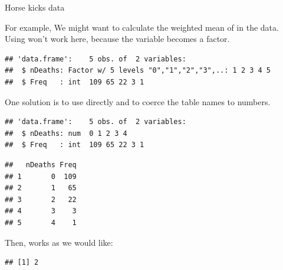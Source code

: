 \documentclass[11pt]{book}
\renewenvironment{knitrout}{\small\renewcommand{\baselinestretch}{.85}}{} %
\begin{document}
\begin{Example}[horse.df]{Horse kicks data}

For example, We might want to calculate the weighted mean of 
in the  data. 
Using  won't work here, because the variable 
becomes a factor.

\begin{knitrout}
\color{fgcolor}\begin{kframe}
\begin{alltt}
\hlstd{(}
\end{alltt}
\begin{verbatim}
## 'data.frame':	5 obs. of  2 variables:
##  $ nDeaths: Factor w/ 5 levels "0","1","2","3",..: 1 2 3 4 5
##  $ Freq   : int  109 65 22 3 1
\end{verbatim}
\end{kframe}
\end{knitrout}
One solution is to use  directly and 
to coerce the table names to numbers.
\begin{knitrout}
\color{fgcolor}\begin{kframe}
\begin{alltt}
 \hlkwb{<-} \hlstd{(} \hlstd{=} \hlstd{(}
                        \hlstd{=} 
\end{alltt}
\begin{verbatim}
## 'data.frame':	5 obs. of  2 variables:
##  $ nDeaths: num  0 1 2 3 4
##  $ Freq   : int  109 65 22 3 1
\end{verbatim}
\begin{alltt}
\end{alltt}
\begin{verbatim}
##   nDeaths Freq
## 1       0  109
## 2       1   65
## 3       2   22
## 4       3    3
## 5       4    1
\end{verbatim}
\end{kframe}
\end{knitrout}
Then,  works as we would like:
\begin{knitrout}
\color{fgcolor}\begin{kframe}
\begin{alltt}
\hlopt{$} \hlopt{$}
\end{alltt}
\begin{verbatim}
## [1] 2
\end{verbatim}
\end{kframe}
\end{knitrout}
\end{Example}
\end{document}
